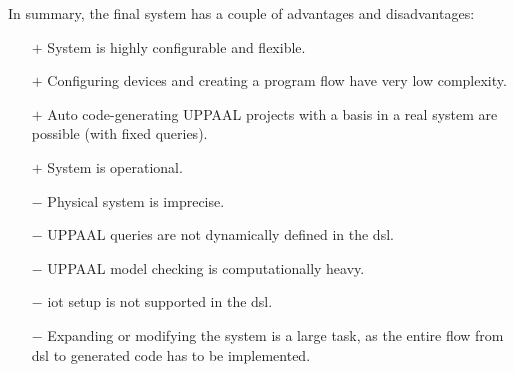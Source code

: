 In summary, the final system has a couple of advantages and disadvantages:

\begin{itemize}
    \item [$+$] System is highly configurable and flexible.
    \item [$+$] Configuring devices and creating a program flow have very low complexity.
    \item [$+$] Auto code-generating UPPAAL projects with a basis in a real system are possible (with fixed queries).
    \item [$+$] System is operational.
    \item [$-$] Physical system is imprecise.
    \item [$-$] UPPAAL queries are not dynamically defined in the \acrshort{dsl}.
    \item [$-$] UPPAAL model checking is computationally heavy.
    \item [$-$] \acrshort{iot} setup is not supported in the \acrshort{dsl}.
    \item [$-$] Expanding or modifying the system is a large task, as the entire flow from \acrshort{dsl} to generated code has to be implemented.
\end{itemize}

